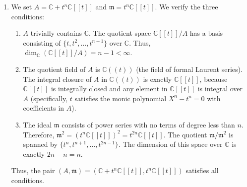 \documentclass{article}
\begin{document}
\begin{enumerate}[label=\fbox{\arabic*}]
\begin{enumerate}[label=(\roman*)]
          If $G$ had multiple subgroups of order $p$, then $Z(G)$ would have multiple subgroups of order $p$, meaning $Z(G)$ is not cyclic. By part (ii) and (i), $Z(G)$ would be an elementary abelian $p$-group, meaning all non-identity elements in $Z(G)$ have order $p$.
          Since $G$ is non-abelian, $G \neq Z(G)$. Let $x \in G \setminus Z(G)$.
          Since all elements of order $p$ are in $Z(G)$, $x$ cannot have order $p$. Thus, $|x| = p^k$ with $k \ge 2$.
          This means $G$ contains a cyclic subgroup of order $p^2$ (generated by $x^{p^{k-2}}$).
          However, because $Z(G)$ is non-cyclic elementary abelian, it contains a subgroup isomorphic to $\mathbb{Z}_p \times \mathbb{Z}_p$ (which also has order $p^2$).
          By $(*_{G})$, there must be an automorphism mapping the cyclic subgroup of order $p^2$ to the non-cyclic subgroup of order $p^2$, which is impossible.
          This contradiction proves that $G$ cannot have multiple subgroups of order $p$. Hence, $G$ contains a unique subgroup of order $p$.
        \end{enumerate}

  \item %
        We set $A = \mathbb{C} + t^n \mathbb{C}[[t]]$ and $\mathfrak{m} = t^n \mathbb{C}[[t]]$. We verify the three conditions:
        \begin{enumerate}[label=(\alph*)]
          \item $A$ trivially contains $\mathbb{C}$. The quotient space $\mathbb{C}[[t]]/A$ has a basis consisting of $\{t, t^2, \dots, t^{n-1}\}$ over $\mathbb{C}$.
          Thus, $\dim_{\mathbb{C}}(\mathbb{C}[[t]]/A) = n - 1 < \infty$.
          \item The quotient field of $A$ is $\mathbb{C}((t))$ (the field of formal Laurent series). The integral closure of $A$ in $\mathbb{C}((t))$ is exactly $\mathbb{C}[[t]]$, because $\mathbb{C}[[t]]$ is integrally closed and any element in $\mathbb{C}[[t]]$ is integral over $A$ (specifically, $t$ satisfies the monic polynomial $X^n - t^n = 0$ with coefficients in $A$).
          \item The ideal $\mathfrak{m}$ consists of power series with no terms of degree less than $n$. 
          Therefore, $\mathfrak{m}^2 = (t^n \mathbb{C}[[t]])^2 = t^{2n} \mathbb{C}[[t]]$.
          The quotient $\mathfrak{m}/\mathfrak{m}^2$ is spanned by $\{t^n, t^{n+1}, \dots, t^{2n-1}\}$.
          The dimension of this space over $\mathbb{C}$ is exactly $2n - n = n$.
        \end{enumerate}
        Thus, the pair $(A, \mathfrak{m}) = (\mathbb{C} + t^n \mathbb{C}[[t]], t^n \mathbb{C}[[t]])$ satisfies all conditions.


\end{enumerate}
\end{document}
